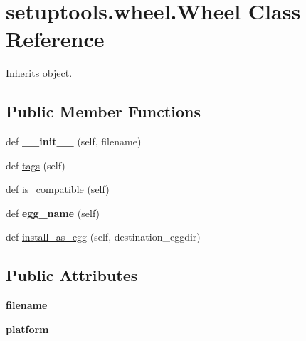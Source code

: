 \hypertarget{classsetuptools_1_1wheel_1_1_wheel}{}\section{setuptools.\+wheel.\+Wheel Class Reference}
\label{classsetuptools_1_1wheel_1_1_wheel}


Inherits object.

\subsection*{Public Member Functions}
\begin{DoxyCompactItemize}
\item 
\mbox{\label{classsetuptools_1_1wheel_1_1_wheel_a65645a6b169144f5aca1c47e227dc7b8}} 
def {\bfseries \+\_\+\+\_\+init\+\_\+\+\_\+} (self, filename)
\item 
def \hyperlink{classsetuptools_1_1wheel_1_1_wheel_a2d24e91430aebfbbafa099eaeb00a5f4}{tags} (self)
\item 
def \hyperlink{classsetuptools_1_1wheel_1_1_wheel_aa3b52caa6023c95670ac3bdb3d730c2c}{is\+\_\+compatible} (self)
\item 
\mbox{\label{classsetuptools_1_1wheel_1_1_wheel_a8003a0c439abab30a420897c391dfbe1}} 
def {\bfseries egg\+\_\+name} (self)
\item 
def \hyperlink{classsetuptools_1_1wheel_1_1_wheel_a4d5d8dcde757279d6509a1f9137e595d}{install\+\_\+as\+\_\+egg} (self, destination\+\_\+eggdir)
\end{DoxyCompactItemize}
\subsection*{Public Attributes}
\begin{DoxyCompactItemize}
\item 
\mbox{\label{classsetuptools_1_1wheel_1_1_wheel_a922b9e7e017e547a8588c48265ee2dc3}} 
{\bfseries filename}
\item 
\mbox{\label{classsetuptools_1_1wheel_1_1_wheel_ab0c549e3d958bd72b70c3b984fe5b1fe}} 
{\bfseries platform}
\end{DoxyCompactItemize}


